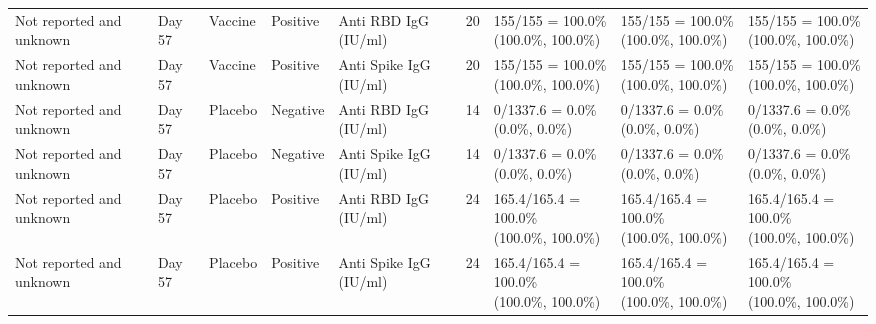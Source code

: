 \documentclass[]{book}
\theoremstyle{definition}
\theoremstyle{definition}
\theoremstyle{definition}
\newcommand{\1}{\mathbbm{1}}
\begin{document}
\begin{landscape}
\begin{ThreePartTable}
\begin{longtable}[t]{>{\raggedright\arraybackslash}p{2.7cm}llllllll}
\hspace{1em}Not reported and unknown & Day 57 & Vaccine & Positive & Anti RBD IgG (IU/ml) & 20 & \makecell[l]{155/155 = 100.0\%\\(100.0\%, 100.0\%)} & \makecell[l]{155/155 = 100.0\%\\(100.0\%, 100.0\%)} & \makecell[l]{155/155 = 100.0\%\\(100.0\%, 100.0\%)}\\
\hspace{1em}Not reported and unknown & Day 57 & Vaccine & Positive & Anti Spike IgG (IU/ml) & 20 & \makecell[l]{155/155 = 100.0\%\\(100.0\%, 100.0\%)} & \makecell[l]{155/155 = 100.0\%\\(100.0\%, 100.0\%)} & \makecell[l]{155/155 = 100.0\%\\(100.0\%, 100.0\%)}\\
\hspace{1em}Not reported and unknown & Day 57 & Placebo & Negative & Anti RBD IgG (IU/ml) & 14 & \makecell[l]{0/1337.6 = 0.0\%\\(0.0\%, 0.0\%)} & \makecell[l]{0/1337.6 = 0.0\%\\(0.0\%, 0.0\%)} & \makecell[l]{0/1337.6 = 0.0\%\\(0.0\%, 0.0\%)}\\
\hspace{1em}Not reported and unknown & Day 57 & Placebo & Negative & Anti Spike IgG (IU/ml) & 14 & \makecell[l]{0/1337.6 = 0.0\%\\(0.0\%, 0.0\%)} & \makecell[l]{0/1337.6 = 0.0\%\\(0.0\%, 0.0\%)} & \makecell[l]{0/1337.6 = 0.0\%\\(0.0\%, 0.0\%)}\\
\hspace{1em}Not reported and unknown & Day 57 & Placebo & Positive & Anti RBD IgG (IU/ml) & 24 & \makecell[l]{165.4/165.4 = 100.0\%\\(100.0\%, 100.0\%)} & \makecell[l]{165.4/165.4 = 100.0\%\\(100.0\%, 100.0\%)} & \makecell[l]{165.4/165.4 = 100.0\%\\(100.0\%, 100.0\%)}\\
\hspace{1em}Not reported and unknown & Day 57 & Placebo & Positive & Anti Spike IgG (IU/ml) & 24 & \makecell[l]{165.4/165.4 = 100.0\%\\(100.0\%, 100.0\%)} & \makecell[l]{165.4/165.4 = 100.0\%\\(100.0\%, 100.0\%)} & \makecell[l]{165.4/165.4 = 100.0\%\\(100.0\%, 100.0\%)}\\*
\end{longtable}
\end{ThreePartTable}



\end{landscape}
\end{document}
